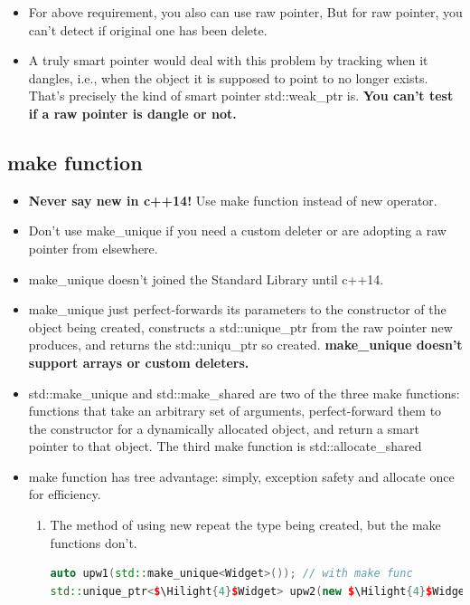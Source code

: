 \documentclass[a4paper,11pt,twoside]{book}
\newcommand{\Hilight}[1]{\makebox[0pt][l]{\color{yellow}\rule[-3pt]{#1em}{11pt}}}
\newcommand{\Hilight}[1]{}
\begin{document}
\begin{itemize}
\item For above requirement, you also can use raw pointer, But for raw pointer, you can't detect if original one has been delete. 

\item A truly smart pointer would deal with this problem by tracking
when it dangles, i.e., when the object it is supposed to point to no longer exists. That's precisely the kind of smart pointer std::weak\_ptr is. \textbf{You can't test if a raw pointer is dangle or not.}
\end{itemize}

\subsection{make function}
\begin{itemize}
	\item \textbf{Never say new in c++14!} Use make function instead of new operator.
	
	\item Don't use make\_unique if you need a custom deleter or are adopting a raw pointer from elsewhere.
	
	\item make\_unique doesn't joined the Standard Library until c++14.
	
	\item make\_unique just perfect-forwards its parameters to the constructor of the object being created, constructs a std::unique\_ptr from the raw pointer new produces, and returns the std::uniqu\_ptr so created. \textbf{make\_unique doesn't support arrays or custom deleters.}
	
	\item std::make\_unique and std::make\_shared are two of the three make functions: functions that take an arbitrary set of arguments, perfect-forward them to the constructor for a dynamically allocated object, and return a smart pointer to that object. The third make function is std::allocate\_shared
	
	\item make function has tree advantage: simply, exception safety and allocate once for efficiency.
	
	\begin{enumerate}
		\item The method of using new repeat the type being created, but the make functions don't.  
\begin{lstlisting}[frame=single, language=c++, mathescape=true]
auto upw1(std::make_unique<Widget>()); // with make func
std::unique_ptr<$\Hilight{4}$Widget> upw2(new $\Hilight{4}$Widget); // without make func
		

\end{lstlisting}
\end{enumerate}
\end{itemize}
\end{document}
